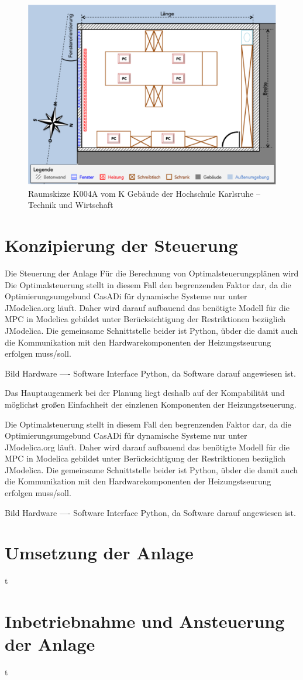 \begin{figure}
\centering
\includegraphics[width=\textwidth]{abbildungen/20160102_k004a}
\caption[Raumskizze K004A vom K Gebäude der Hochschule Karlsruhe -- Technik und Wirtschaft]{Raumskizze K004A vom K Gebäude der Hochschule Karlsruhe -- Technik und Wirtschaft}
\label{fig:skizzek004a}
\end{figure}

\section{Konzipierung der Steuerung}
Die Steuerung der Anlage 
Für die Berechnung von Optimalsteuerungsplänen wird 
Die Optimalsteuerung stellt in diesem Fall den begrenzenden Faktor dar, da die Optimierungsumgebund CasADi für dynamische Systeme nur unter JModelica.org läuft. Daher wird darauf aufbauend das benötigte Modell für die MPC in Modelica gebildet unter Berücksichtigung der Restriktionen bezüglich JModelica. Die gemeinsame Schnittstelle beider ist Python, übder die damit auch die Kommunikation mit den Hardwarekomponenten der Heizungstseurung erfolgen muss/soll.

Bild Hardware ---- Software   Interface Python, da Software darauf angewiesen ist.



Das Hauptaugenmerk bei der Planung liegt deshalb auf der Kompabilität und möglichst großen Einfachheit der einzlenen Komponenten der Heizungstseuerung. 

Die Optimalsteuerung stellt in diesem Fall den begrenzenden Faktor dar, da die Optimierungsumgebund CasADi für dynamische Systeme nur unter JModelica.org läuft. Daher wird darauf aufbauend das benötigte Modell für die MPC in Modelica gebildet unter Berücksichtigung der Restriktionen bezüglich JModelica. Die gemeinsame Schnittstelle beider ist Python, übder die damit auch die Kommunikation mit den Hardwarekomponenten der Heizungstseurung erfolgen muss/soll.

Bild Hardware ---- Software   Interface Python, da Software darauf angewiesen ist.

\section{Umsetzung der Anlage}
t 
\newpage

\section{Inbetriebnahme und Ansteuerung der Anlage}

t 
\newpage